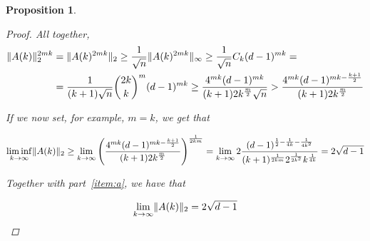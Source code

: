 \documentclass{amsart}
\theoremstyle{plain}
\newtheorem*{proposition}{\textbf{Proposition}}
\theoremstyle{definition}
\DeclarePairedDelimiter{\norm}{\lVert}{\rVert}
\begin{document}
\begin{proposition}
\begin{proof}
            All together,
            \begin{align*}
                    \norm{A(k)}_2^{2mk}
                    & = \norm{A(k)^{2mk}}_2
                    \geq \frac{1}{\sqrt{n}} \norm{A(k)^{2mk}}_\infty
                    \geq \frac{1}{\sqrt{n}} C_{k} (d-1)^{mk} = \\
                    & = \frac{1}{(k+1)\sqrt{n}} \binom{2k}{k}^{m} (d-1)^{mk} \geq
                    \frac{4^{mk}(d-1)^{mk}}{(k+1)2k^{\frac{m}{2}}\sqrt{n}} >
                    \frac{4^{mk}(d-1)^{mk - \frac{k+1}{2}}}{(k+1)2k^{\frac{m}{2}}}
            \end{align*}

            If we now set, for example, $m = k$, we get that

            \begin{equation*}
                \liminf_{k \to \infty} \norm{A(k)}_2 \geq
                \lim_{k \to \infty} \left( \frac{4^{mk}(d-1)^{mk - \frac{k+1}{2}}}{(k+1)2k^{\frac{m}{2}}} \right)^{\frac{1}{2km}} =
                \lim_{k \to \infty} 2 \frac{(d-1)^{\frac{1}{2} - \frac{1}{4k} - \frac{1}{4k^2}}}{(k+1)^{\frac{1}{2km}} 2^{\frac{1}{2k^2}} k ^{\frac{1}{4k}}}
                = 2 \sqrt{d-1}
            \end{equation*}

            Together with part~\ref{item:a}, we have that

            \begin{equation*}
                \lim_{k \to \infty} \norm{A(k)}_2 = 2 \sqrt{d-1}
            \end{equation*}

        \end{proof}
    \end{proposition}
\end{document}
